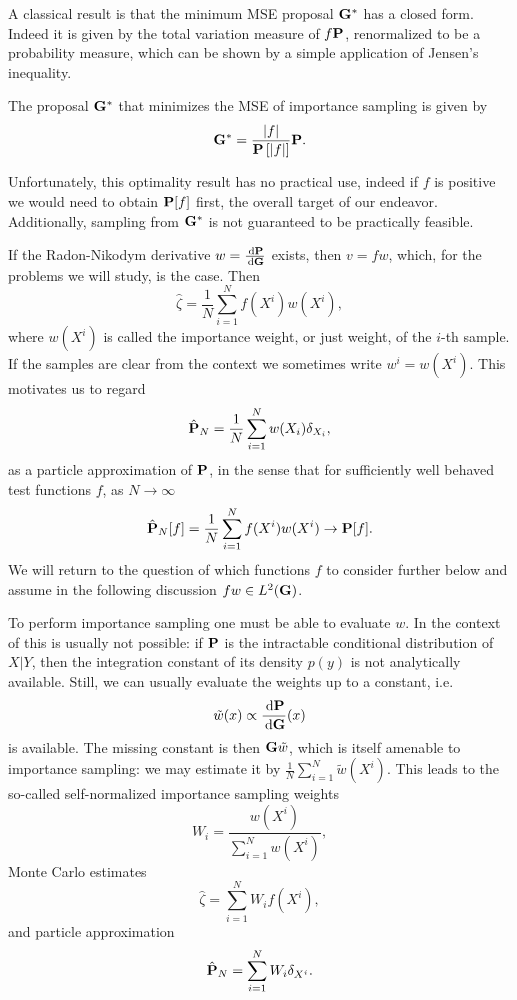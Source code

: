 A classical result is that the minimum MSE proposal $\G^\ast$ has a closed form. Indeed it is given by the total variation measure of $f\P$, renormalized to be a probability measure, which can be shown by a simple application of Jensen's inequality. 
\begin{proposition}
    \label{prop:minimum_MSE_IS}
    The proposal $\G^{\ast}$ that minimizes the MSE of importance sampling is given by
    $$
    \G^{\ast}  = \frac{\lvert f \rvert}{\P\left[\lvert f \rvert \right]} \P.
    $$
\end{proposition}
Unfortunately, this optimality result has no practical use, indeed if $f$ is positive we would need to obtain $\P[f]$ first, the overall target of our endeavor. Additionally, sampling from $\G^{\ast}$ is not guaranteed to be practically feasible. 

If the Radon-Nikodym derivative $w = \frac{\d\P}{\d\G}$ exists, then $v = fw$, which, for the problems we will study, is the case. Then 
$$
\hat \zeta = \frac{1}{N} \sum_{i = 1}^N f(X^{i})w(X^{i}),
$$
where $w(X^{i})$ is called the importance weight, or just weight, of the $i$-th sample. If the samples are clear from the context we sometimes write $w^{i} = w(X^{i})$. 
This motivates us to regard
\begin{align}
\label{eq:is-particle-approximation}
\hat \P_N = \frac{1}{N} \sum_{i = 1}^{N} w(X_i) \delta_{X_i},
\end{align}
as a particle approximation of $\P$, in the sense that for sufficiently well behaved test functions $f$, as $N \to \infty$ $$
\hat\P_{N}[f] = \frac{1}{N} \sum_{i = 1}^N f(X^{i})w(X^{i})\to \P [f].
$$
We will return to the question of which functions $f$ to consider further below and assume in the following discussion $fw \in L^{2}(\G)$.

To perform importance sampling one must be able to evaluate $w$. In the context of  this is usually not possible: if $\P$ is the intractable conditional distribution of $X|Y$, then the integration constant of its density $p(y)$ is not analytically available.
Still, we can usually evaluate the weights up to a constant, i.e. $$\tilde w(x) \propto \frac{\d \P}{\d \G}(x)$$ is available. The missing constant is then $\G \tilde w$, which is itself amenable to importance sampling: we may estimate it by $\frac{1}{N}\sum_{i = 1}^N \tilde w(X^{i})$.
This leads to the so-called self-normalized importance sampling weights 
$$W_i = \frac{w(X^i)}{\sum_{i = 1}^N w(X^i)},$$
Monte Carlo estimates 
$$\hat \zeta = \sum_{i = 1}^{N} W_i f(X^i),$$
and particle approximation 
$$\hat \P_N = \sum_{i = 1}^{N} W_i \delta_{X^i}.$$

